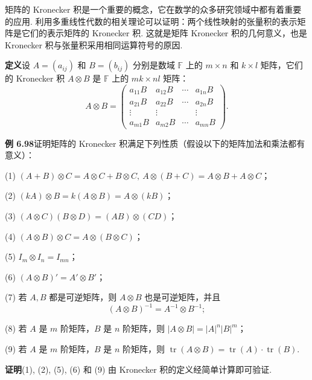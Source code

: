 \documentclass[UTF8, 12pt, fontset=fandol, oneside]{ctexart}
\begin{document}
矩阵的 Kronecker 积是一个重要的概念，它在数学的众多研究领域中都有着重要的应用. 利用多重线性代数的相关理论可以证明：两个线性映射的张量积的表示矩阵是它们的表示矩阵的 Kronecker 积. 这就是矩阵 Kronecker 积的几何意义，也是 Kronecker 积与张量积采用相同运算符号的原因.

\noindent\textbf{定义}\quad 设 $A=(a_{ij})$ 和 $B=(b_{ij})$ 分别是数域 $\mathbb{F}$ 上的 $m\times n$ 和 $k\times l$ 矩阵，它们的 Kronecker 积 $A\otimes B$ 是 $\mathbb{F}$ 上的 $mk\times nl$ 矩阵：
\[
A\otimes B=
\begin{pmatrix}
a_{11}B&a_{12}B&\cdots&a_{1n}B\\
a_{21}B&a_{22}B&\cdots&a_{2n}B\\
\vdots&\vdots&&\vdots\\
a_{m1}B&a_{m2}B&\cdots&a_{mn}B
\end{pmatrix}.
\]

\noindent\textbf{例 6.98}\quad 证明矩阵的 Kronecker 积满足下列性质（假设以下的矩阵加法和乘法都有意义）：

(1) $(A+B)\otimes C=A\otimes C+B\otimes C,\ A\otimes(B+C)=A\otimes B+A\otimes C$；

(2) $(kA)\otimes B=k(A\otimes B)=A\otimes(kB)$；

(3) $(A\otimes C)(B\otimes D)=(AB)\otimes(CD)$；

(4) $(A\otimes B)\otimes C=A\otimes(B\otimes C)$；

(5) $I_m\otimes I_n=I_{mn}$；

(6) $(A\otimes B)'=A'\otimes B'$；

(7) 若 $A,B$ 都是可逆矩阵，则 $A\otimes B$ 也是可逆矩阵，并且
\[
(A\otimes B)^{-1}=A^{-1}\otimes B^{-1};
\]

(8) 若 $A$ 是 $m$ 阶矩阵，$B$ 是 $n$ 阶矩阵，则 $|A\otimes B|=|A|^n|B|^m$；

(9) 若 $A$ 是 $m$ 阶矩阵，$B$ 是 $n$ 阶矩阵，则 $\operatorname{tr}(A\otimes B)=\operatorname{tr}(A)\cdot\operatorname{tr}(B)$.

\noindent\textbf{证明}\quad (1), (2), (5), (6) 和 (9) 由 Kronecker 积的定义经简单计算即可验证.
\end{document}
